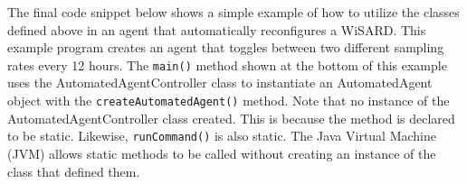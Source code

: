 %
  
 
 
 The final code snippet below shows a simple example of how to utilize the classes defined above in an agent that automatically reconfigures a WiSARD. This example program creates an agent that toggles between two different sampling rates every 12 hours. The \verb|main()| method shown at the bottom of this example uses the AutomatedAgentController class to instantiate an AutomatedAgent object with the \verb|createAutomatedAgent()| method. Note that no instance of the AutomatedAgentController class created. This is because the method is declared to be static. Likewise, \verb|runCommand()| is also static. The Java Virtual Machine (JVM) allows static methods to be called without creating an instance of the class that defined them.
 
 
 
 

 	






